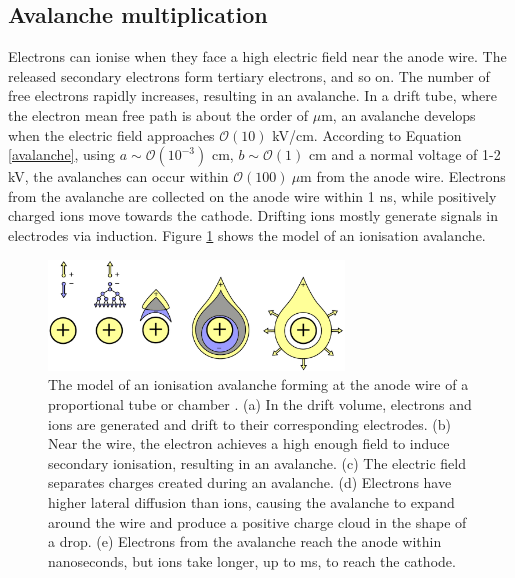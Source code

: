 \subsection{Avalanche multiplication}
Electrons can ionise when they face a high electric field near the anode wire. 
The released secondary electrons form tertiary electrons, and so on.
The number of free electrons rapidly increases, 
resulting in an avalanche. In a drift tube, where the electron mean free path is about the order of $\mu$m, 
an avalanche develops when the electric field approaches $\mathcal{O}(10)$ kV/cm.
According to Equation \ref{avalanche}, using $a \sim \mathcal{O}(10^{-3})$ cm, $b \sim \mathcal{O}(1)$ cm and
a normal voltage of 1-2 kV, the avalanches can occur within $\mathcal{O}(100) \ \mu$m from the anode wire. 
Electrons from the avalanche are collected on the anode wire within 1 ns, while positively charged ions move towards the cathode.
Drifting ions mostly generate signals in electrodes via induction. Figure \ref{fig:avalanche} shows the model of an ionisation avalanche.
\begin{figure}[!h]
    \centering
    \includegraphics[width =0.7\textwidth]{figures/png/Screenshot_20240330_182509.png}
    \caption[The model of an ionisation avalanche forming at the anode wire of a proportional tube.]{The model 
    of an ionisation avalanche forming at the anode wire of a proportional tube or chamber \cite{kola}. 
    (a) In the drift volume, electrons and ions are generated and drift to their corresponding electrodes. 
    (b) Near the wire, the electron achieves a high enough field to induce secondary ionisation, resulting in an avalanche. 
    (c) The electric field separates charges created during an avalanche. 
    (d) Electrons have higher lateral diffusion than ions, causing the avalanche to expand 
    around the wire and produce a positive charge cloud in the shape of a drop. 
    (e) Electrons from the avalanche reach the anode within nanoseconds, but ions take longer, up to ms, to reach the cathode.}
    \label{fig:avalanche}
\end{figure}
